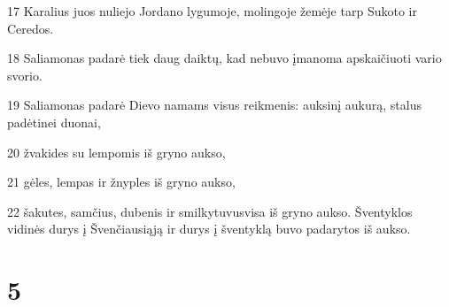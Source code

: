 \par 17 Karalius juos nuliejo Jordano lygumoje, molingoje žemėje tarp Sukoto ir Ceredos. 
\par 18 Saliamonas padarė tiek daug daiktų, kad nebuvo įmanoma apskaičiuoti vario svorio. 
\par 19 Saliamonas padarė Dievo namams visus reikmenis: auksinį aukurą, stalus padėtinei duonai, 
\par 20 žvakides su lempomis iš gryno aukso, 
\par 21 gėles, lempas ir žnyples iš gryno aukso, 
\par 22 šakutes, samčius, dubenis ir smilkytuvus­visa iš gryno aukso. Šventyklos vidinės durys į Švenčiausiąją ir durys į šventyklą buvo padarytos iš aukso.



\chapter{5}


